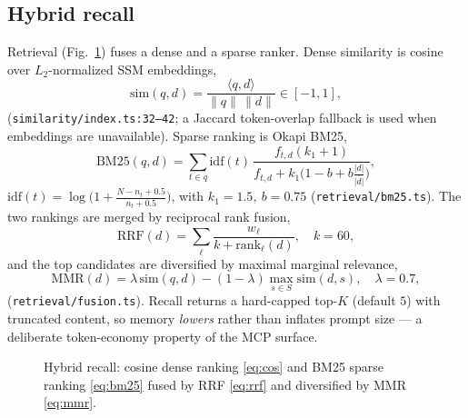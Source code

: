 \documentclass[journal,onecolumn,11pt]{IEEEtran}
\begin{document}
\subsection{Hybrid recall}
\label{sec:recall}
Retrieval (Fig.~\ref{fig:retrieval}) fuses a dense and a sparse ranker. Dense
similarity is cosine over $L_2$-normalized SSM embeddings,
\begin{equation}
\mathrm{sim}(q,d)=\frac{\langle q,d\rangle}{\lVert q\rVert\,\lVert d\rVert}\in[-1,1],
\label{eq:cos}
\end{equation}
(\texttt{similarity/index.ts:32--42}; a Jaccard token-overlap fallback is used
when embeddings are unavailable). Sparse ranking is Okapi BM25,
\begin{equation}
\mathrm{BM25}(q,d)=\sum_{t\in q}\mathrm{idf}(t)\,
\frac{f_{t,d}(k_1{+}1)}{f_{t,d}+k_1\!\big(1-b+b\frac{|d|}{\overline{|d|}}\big)},
\label{eq:bm25}
\end{equation}
$\mathrm{idf}(t)=\log\!\big(1+\frac{N-n_t+0.5}{n_t+0.5}\big)$, with
$k_1{=}1.5,\ b{=}0.75$ (\texttt{retrieval/bm25.ts}). The two rankings are merged by
reciprocal rank fusion,
\begin{equation}
\mathrm{RRF}(d)=\sum_{\ell}\frac{w_\ell}{k+\mathrm{rank}_\ell(d)},\quad k=60,
\label{eq:rrf}
\end{equation}
and the top candidates are diversified by maximal marginal relevance,
\begin{equation}
\mathrm{MMR}(d)=\lambda\,\mathrm{sim}(q,d)-(1-\lambda)\max_{s\in S}\mathrm{sim}(d,s),
\quad \lambda=0.7,
\label{eq:mmr}
\end{equation}
(\texttt{retrieval/fusion.ts}). Recall returns a hard-capped top-$K$ (default
$5$) with truncated content, so memory \emph{lowers} rather than inflates prompt
size --- a deliberate token-economy property of the MCP surface.

\begin{figure}[t]
\centering

\caption{Hybrid recall: cosine dense ranking \eqref{eq:cos} and BM25 sparse
ranking \eqref{eq:bm25} fused by RRF \eqref{eq:rrf} and diversified by MMR
\eqref{eq:mmr}.}
\label{fig:retrieval}
\end{figure}
\end{document}
